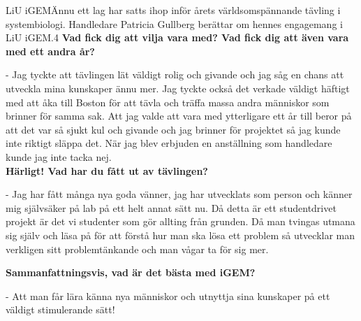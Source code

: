 \begin{news}{3}{LiU iGEM}{Ännu ett lag
  har satts ihop inför årets världsomspännande tävling i
  systembiologi. Handledare Patricia Gullberg berättar om hennes
  engagemang i LiU iGEM.}{}{4}{}
 \noindent \textbf{Vad fick dig att vilja vara med? Vad fick dig att även vara
    med ett andra år?}

  - Jag tyckte att tävlingen lät väldigt rolig och
  givande och jag såg en chans att utveckla mina kunskaper ännu
  mer. Jag tyckte också det verkade väldigt häftigt med att åka till
  Boston för att tävla och träffa massa andra människor som brinner
  för samma sak. Att jag valde att vara med ytterligare ett år till
  beror på att det var så sjukt kul och givande och jag brinner för
  projektet så jag kunde inte riktigt släppa det. När jag blev
  erbjuden en anställning som handledare kunde jag inte tacka nej.
\\

 \noindent \textbf{Härligt! Vad har du fått ut av tävlingen?}

  - Jag har fått många
  nya goda vänner, jag har utvecklats som person och känner mig
  självsäker på lab på ett helt annat sätt nu. Då detta är ett
  studentdrivet projekt är det vi studenter som gör allting från
  grunden. Då man tvingas utmana sig själv och läsa på för att förstå
  hur man ska lösa ett problem så utvecklar man verkligen sitt
  problemtänkande och man vågar ta för sig mer.
\\



 \noindent \textbf{Sammanfattningsvis, vad är det bästa med iGEM?}

  - Att man får
  lära känna nya människor och utnyttja sina kunskaper på ett väldigt
  stimulerande sätt!
\end{news}


%
%
%
%
